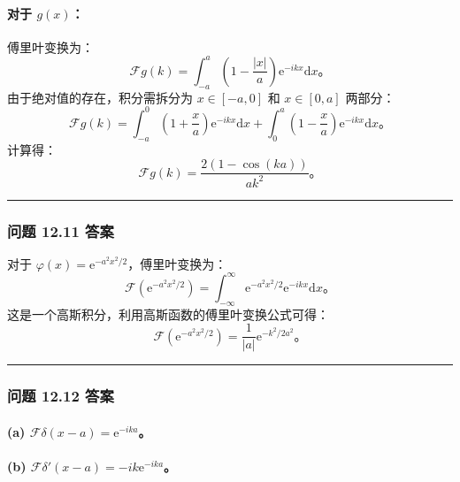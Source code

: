 \paragraph{\texorpdfstring{对于
$g(x)$：}{对于 g(x)：}}\label{ux5bf9ux4e8e-gx}

傅里叶变换为：
 $$
\mathcal{F}g(k) = \int_{-a}^a \left(1 - \frac{|x|}{a}\right) \mathrm{e}^{-i k x} \mathrm{d}x。
$$
由于绝对值的存在，积分需拆分为 $x \in [-a, 0]$ 和 $x \in [0, a]$
两部分：
 $$
\mathcal{F}g(k) = \int_{-a}^0 \left(1 + \frac{x}{a}\right) \mathrm{e}^{-i k x} \mathrm{d}x + \int_{0}^a \left(1 - \frac{x}{a}\right) \mathrm{e}^{-i k x} \mathrm{d}x。
$$
计算得：
 $$
\mathcal{F}g(k) = \frac{2(1 - \cos(ka))}{a k^2}。
$$
\begin{center}\rule{0.5\linewidth}{0.5pt}\end{center}

\subsubsection{问题 12.11 答案}\label{ux95eeux9898-12.11-ux7b54ux6848}

对于 $\varphi(x) = \mathrm{e}^{-a^2 x^2 / 2}$，傅里叶变换为：
 $$
\mathcal{F}\left(\mathrm{e}^{-a^2 x^2 / 2}\right) = \int_{-\infty}^\infty \mathrm{e}^{-a^2 x^2 / 2} \mathrm{e}^{-i k x} \mathrm{d}x。
$$
这是一个高斯积分，利用高斯函数的傅里叶变换公式可得：
 $$
\mathcal{F}\left(\mathrm{e}^{-a^2 x^2 / 2}\right) = \frac{1}{|a|} \mathrm{e}^{-k^2 / 2a^2}。
$$
\begin{center}\rule{0.5\linewidth}{0.5pt}\end{center}

\subsubsection{问题 12.12 答案}\label{ux95eeux9898-12.12-ux7b54ux6848}

\paragraph{\texorpdfstring{(a)
$\mathcal{F}\delta(x-a) = \mathrm{e}^{-i k a}$。}{(a) \textbackslash mathcal\{F\}\textbackslash delta(x-a) = \textbackslash mathrm\{e\}\^{}\{-i k a\}。}}\label{a-mathcalfdeltax-a-mathrme-i-k-a}

\paragraph{\texorpdfstring{(b)
$\mathcal{F}\delta'(x-a) = -i k \mathrm{e}^{-i k a}$。}{(b) \textbackslash mathcal\{F\}\textbackslash delta\textegsingle(x-a) = -i k \textbackslash mathrm\{e\}\^{}\{-i k a\}。}}\label{b-mathcalfdeltax-a--i-k-mathrme-i-k-a}

